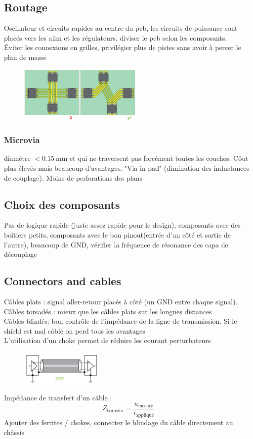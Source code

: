 \documentclass[resume]{subfiles}
\begin{document}
\begin{multicols}{3}
\subsection{Routage}
Oscillateur et circuits rapides au centre du pcb, les circuits de puissance sont placés vers les alim et les régulateurs, diviser le pcb selon les composants.\\
Éviter les connexions en grilles, privilégier plus de pistes sans avoir à percer le plan de masse
\begin{figure}[H]
\centering
\includegraphics[width=6.00cm]{img_28.png}
\end{figure}
\subsubsection{Microvia}
diamètre $<\SI{0.15}{\milli\meter}$ et qui ne traversent pas forcément toutes les couches. Côut plus élevés mais beaucoup d'avantages. "Via-in-pad" (diminution des inductances de couplage). Moins de perforations des plans
\subsection{Choix des composants}
Pas de logique rapide (juste assez rapide pour le design), composants avec des boîtiers petits, composants avec le bon pinout(entrée d'un côté et sortie de l'autre), beaucoup de GND, vérifier la fréquence de résonance des capa de découplage

\subsection{Connectors and cables}
Câbles plats : signal aller-retour placés à côté (un GND entre chaque signal).\\
Câbles torsadés : mieux que les câbles plats sur les longues distances\\
Câbles blindés: bon contrôle de l'impédance de la ligne de transmission. Si le shield est mal câblé on perd tous les avantages\\
L'utilisation d'un choke permet de réduire les courant perturbateurs
\begin{figure}[H]
\centering
\includegraphics[width=4.00cm]{img_29.png}
\end{figure}
Impédance de transfert d'un câble :
$$Z_\text{transfer}=\frac{u_{\text{mesuré}}}{i_{\text{appliqué}}}$$
Ajouter des ferrites / chokes, connecter le blindage du câble directement au châssis

\end{multicols}
\end{document}
